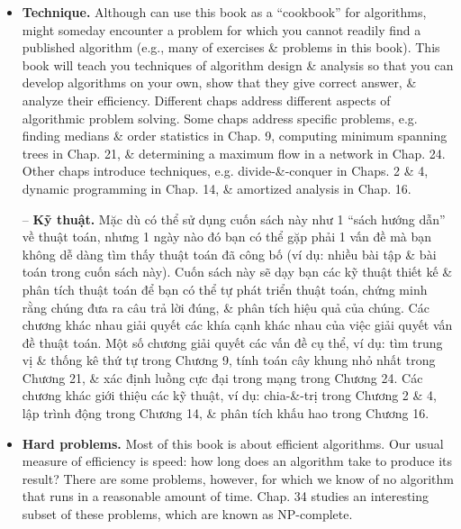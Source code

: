 \documentclass{article}
\begin{document}
\begin{itemize}
\begin{itemize}
\begin{itemize}
            {\bf Data structures.} This book also presents several data structures. A {\it data structure} is a way to store \& organize data in order to facilitate access \& modifications. Using appropriate data structure or structures is an important part of algorithm design. No single data structure works well for all purposes, \& so you should know strengths \& limitations of serval of them.
            
            -- {\bf Cấu trúc dữ liệu.} Cuốn sách này cũng trình bày 1 số cấu trúc dữ liệu. {\it cấu trúc dữ liệu} là 1 cách để lưu trữ \& tổ chức dữ liệu nhằm tạo điều kiện truy cập \& sửa đổi. Sử dụng cấu trúc dữ liệu hoặc các cấu trúc phù hợp là 1 phần quan trọng của thiết kế thuật toán. Không có cấu trúc dữ liệu đơn lẻ nào hoạt động tốt cho mọi mục đích, \& vì vậy bạn nên biết điểm mạnh \& hạn chế của 1 số cấu trúc.
            \item {\bf Technique.} Although can use this book as a ``cookbook'' for algorithms, might someday encounter a problem for which you cannot readily find a published algorithm (e.g., many of exercises \& problems in this book). This book will teach you techniques of algorithm design \& analysis so that you can develop algorithms on your own, show that they give correct answer, \& analyze their efficiency. Different chaps address different aspects of algorithmic problem solving. Some chaps address specific problems, e.g. finding medians \& order statistics in Chap. 9, computing minimum spanning trees in Chap. 21, \& determining a maximum flow in a network in Chap. 24. Other chaps introduce techniques, e.g. divide-\&-conquer in Chaps. 2 \& 4, dynamic programming in Chap. 14, \& amortized analysis in Chap. 16.
            
            -- {\bf Kỹ thuật.} Mặc dù có thể sử dụng cuốn sách này như 1 ``sách hướng dẫn'' về thuật toán, nhưng 1 ngày nào đó bạn có thể gặp phải 1 vấn đề mà bạn không dễ dàng tìm thấy thuật toán đã công bố (ví dụ: nhiều bài tập \& bài toán trong cuốn sách này). Cuốn sách này sẽ dạy bạn các kỹ thuật thiết kế \& phân tích thuật toán để bạn có thể tự phát triển thuật toán, chứng minh rằng chúng đưa ra câu trả lời đúng, \& phân tích hiệu quả của chúng. Các chương khác nhau giải quyết các khía cạnh khác nhau của việc giải quyết vấn đề thuật toán. Một số chương giải quyết các vấn đề cụ thể, ví dụ: tìm trung vị \& thống kê thứ tự trong Chương 9, tính toán cây khung nhỏ nhất trong Chương 21, \& xác định luồng cực đại trong mạng trong Chương 24. Các chương khác giới thiệu các kỹ thuật, ví dụ: chia-\&-trị trong Chương 2 \& 4, lập trình động trong Chương 14, \& phân tích khấu hao trong Chương 16.
            \item {\bf Hard problems.} Most of this book is about efficient algorithms. Our usual measure of efficiency is speed: how long does an algorithm take to produce its result? There are some problems, however, for which we know of no algorithm that runs in a reasonable amount of time. Chap. 34 studies an interesting subset of these problems, which are known as NP-complete.
            

\end{itemize}
\end{itemize}
\end{itemize}
\end{document}
